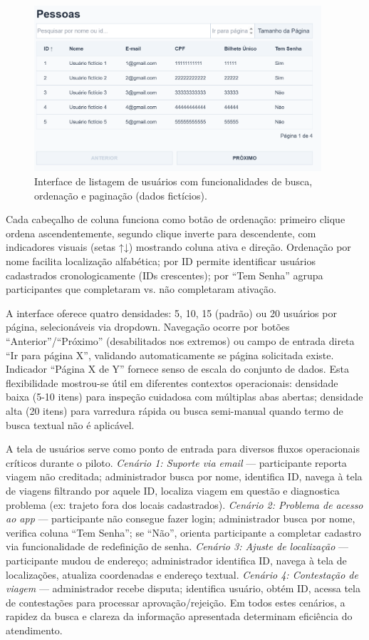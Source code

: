 \begin{figure}[H]
    \centering
    \includegraphics[width=0.95\textwidth]{figuras/pessoas.PNG}
    \caption{Interface de listagem de usuários com funcionalidades de busca, ordenação e paginação (dados fictícios).}
    \label{fig:usuarios_listagem}
  \end{figure}

Cada cabeçalho de coluna funciona como botão de
ordenação: primeiro clique ordena ascendentemente, segundo clique inverte para
descendente, com indicadores visuais (setas ↑↓) mostrando coluna ativa e direção.
Ordenação por nome facilita localização alfabética; por ID permite identificar
usuários cadastrados cronologicamente (IDs crescentes); por ``Tem Senha'' agrupa
participantes que completaram vs. não completaram ativação.

A interface oferece quatro densidades: 5, 10, 15
(padrão) ou 20 usuários por página, selecionáveis via dropdown. Navegação ocorre por
botões ``Anterior''/``Próximo'' (desabilitados nos extremos) ou campo de entrada
direta ``Ir para página X'', validando automaticamente se página solicitada existe.
Indicador ``Página X de Y'' fornece senso de escala do conjunto de dados. Esta
flexibilidade mostrou-se útil em diferentes contextos operacionais: densidade baixa
(5-10 itens) para inspeção cuidadosa com múltiplas abas abertas; densidade alta
(20 itens) para varredura rápida ou busca semi-manual quando termo de busca textual
não é aplicável.

A tela de usuários serve como ponto de
entrada para diversos fluxos operacionais críticos durante o piloto. \textit{Cenário
1: Suporte via email} --- participante reporta viagem não creditada; administrador
busca por nome, identifica ID, navega à tela de viagens filtrando por aquele ID,
localiza viagem em questão e diagnostica problema (ex: trajeto fora dos locais
cadastrados). \textit{Cenário 2: Problema de acesso ao app} --- participante não
consegue fazer login; administrador busca por nome, verifica coluna ``Tem Senha''; se
``Não'', orienta participante a completar cadastro via funcionalidade de redefinição
de senha. \textit{Cenário 3: Ajuste de localização} --- participante mudou de
endereço; administrador identifica ID, navega à tela de localizações, atualiza
coordenadas e endereço textual. \textit{Cenário 4: Contestação de viagem} ---
administrador recebe disputa; identifica usuário, obtém ID, acessa tela de
contestações para processar aprovação/rejeição. Em todos estes cenários, a rapidez
da busca e clareza da informação apresentada determinam eficiência do atendimento.

